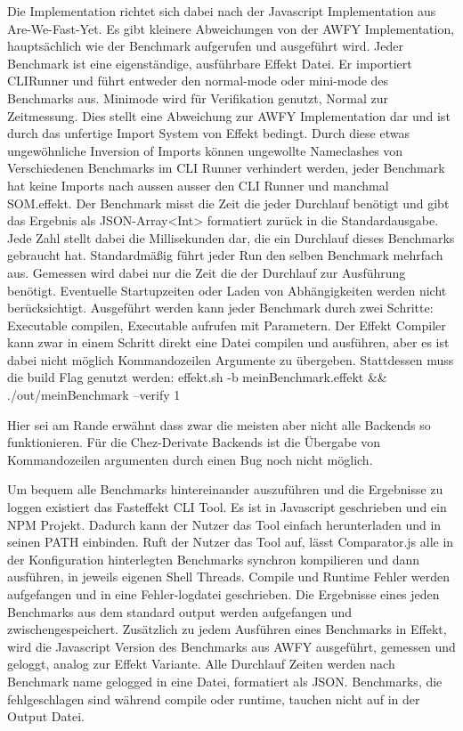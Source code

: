         Die Implementation richtet sich dabei nach der Javascript Implementation aus Are-We-Fast-Yet.
        Es gibt kleinere Abweichungen von der AWFY Implementation, hauptsächlich wie der Benchmark aufgerufen und ausgeführt wird. 
     Jeder Benchmark ist eine eigenständige, ausführbare Effekt Datei. Er importiert CLIRunner und führt entweder den normal-mode oder mini-mode des Benchmarks aus. Minimode wird für Verifikation genutzt, Normal zur Zeitmessung.
     Dies stellt eine Abweichung zur AWFY Implementation dar und ist durch das unfertige Import System von Effekt bedingt.
     Durch diese etwas ungewöhnliche Inversion of Imports können ungewollte Nameclashes von Verschiedenen Benchmarks im CLI Runner verhindert werden, jeder Benchmark hat keine Imports nach aussen ausser den CLI Runner und manchmal SOM.effekt.
     Der Benchmark misst die Zeit die jeder Durchlauf benötigt und gibt das Ergebnis als JSON-Array<Int> formatiert zurück in die Standardausgabe. Jede Zahl stellt dabei die Millisekunden dar, die ein Durchlauf dieses Benchmarks gebraucht hat.
     Standardmäßig führt jeder Run den selben Benchmark mehrfach aus.
     Gemessen wird dabei nur die Zeit die der Durchlauf zur Ausführung benötigt. Eventuelle Startupzeiten oder Laden von Abhängigkeiten werden nicht berücksichtigt.
     Ausgeführt werden kann jeder Benchmark durch zwei Schritte: Executable compilen, Executable aufrufen mit Parametern.
     Der Effekt Compiler kann zwar in einem Schritt direkt eine Datei compilen und ausführen, aber es ist dabei nicht möglich Kommandozeilen Argumente zu übergeben.
     Stattdessen muss die build Flag genutzt werden:
    effekt.sh -b meinBenchmark.effekt && ./out/meinBenchmark --verify 1
    
    Hier sei am Rande erwähnt dass zwar die meisten aber nicht alle Backends so funktionieren. Für die Chez-Derivate Backends ist die Übergabe von Kommandozeilen argumenten durch einen Bug noch nicht möglich.
    
    
    Um bequem alle Benchmarks hintereinander auszuführen und die Ergebnisse zu loggen existiert das Fasteffekt CLI Tool.
    Es ist in Javascript geschrieben und ein NPM Projekt. Dadurch kann der Nutzer das Tool einfach herunterladen und in seinen PATH einbinden.
    Ruft der Nutzer das Tool auf, lässt Comparator.js alle in der Konfiguration hinterlegten Benchmarks synchron kompilieren und dann ausführen, in jeweils eigenen Shell Threads. Compile und Runtime Fehler werden aufgefangen und in eine Fehler-logdatei geschrieben. Die Ergebnisse eines jeden Benchmarks aus dem standard output werden aufgefangen und zwischengespeichert.
    Zusätzlich zu jedem Ausführen eines Benchmarks in Effekt, wird die Javascript Version des Benchmarks aus AWFY ausgeführt, gemessen und geloggt, analog zur Effekt Variante.
    Alle Durchlauf Zeiten werden nach Benchmark name gelogged in eine Datei, formatiert als JSON.
    Benchmarks, die fehlgeschlagen sind während compile oder runtime, tauchen nicht auf in der Output Datei.
    
